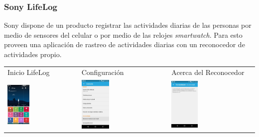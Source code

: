 \subsubsection{Sony LifeLog}
\label{intro:sony-lifelog}\label{intro:har-life-log}
Sony dispone de un producto registrar las actividades diarias de las personas por medio de sensores
del celular o por medio de las relojes \emph{smartwatch}. Para esto proveen una aplicación de rastreo de actividades
diarias con un reconocedor de actividades propio.
\begin{table}[!htbp]
\begin{tabular}{lll}
\textsf{\relax 
Inicio LifeLog
} & \textsf{\relax 
Configuración
} & \textsf{\relax 
Acerca del Reconocedor
}\\
\includegraphics[width=0.33\textwidth]{anexos/graphics/lf_start.jpg}
 & 
\includegraphics[width=0.33\textwidth]{anexos/graphics/lf_conf.jpg}
 & 
\includegraphics[width=0.33\textwidth]{anexos/graphics/lf_actrec.jpg}

\end{tabular}
\end{table}

